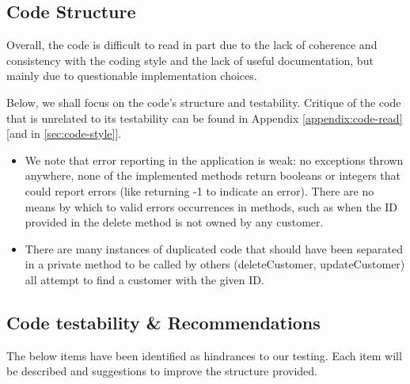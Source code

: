 
\subsection{Code Structure} 
Overall, the code is difficult to read in part due to the lack of coherence and consistency with the coding style and the lack of useful documentation, but mainly due to questionable implementation choices. 

Below, we shall focus on the code's structure and testability. Critique of the code that is unrelated to its testability can be found in Appendix \ref{appendix:code-read} [and in \ref{sec:code-style}]. 

\begin{itemize}
	\item We note that error reporting in the application is weak: no exceptions thrown anywhere, none of the implemented methods return booleans or integers that could report errors (like returning -1 to indicate an error). There are no means by which  to valid errors occurrences in methods, such as when the ID provided in the delete method is not owned by any customer. 
	\item There are many instances of duplicated code that should have been separated in a private method to be called by others (deleteCustomer, updateCustomer) all attempt to find a customer with the given ID. 
\end{itemize}

\subsection{Code testability \& Recommendations}

The below items have been identified as hindrances to our testing. Each item will be described and suggestions to improve the structure provided. 

